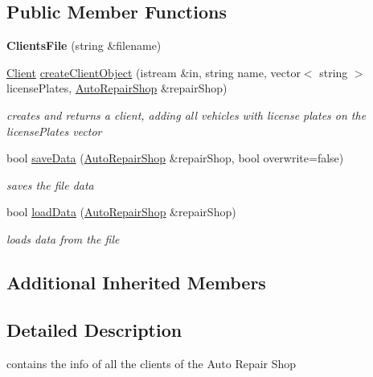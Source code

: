 \subsection*{Public Member Functions}
\begin{DoxyCompactItemize}
\item 
\hypertarget{class_clients_file_a193a5c33a221b9a7a240c8e21325f5bc}{}{\bfseries Clients\+File} (string \&filename)\label{class_clients_file_a193a5c33a221b9a7a240c8e21325f5bc}

\item 
\hypertarget{class_clients_file_a208a3388f95c5b181708d82f24f73807}{}\hyperlink{class_client}{Client} \hyperlink{class_clients_file_a208a3388f95c5b181708d82f24f73807}{create\+Client\+Object} (istream \&in, string name, vector$<$ string $>$ license\+Plates, \hyperlink{class_auto_repair_shop}{Auto\+Repair\+Shop} \&repair\+Shop)\label{class_clients_file_a208a3388f95c5b181708d82f24f73807}

\begin{DoxyCompactList}\small\item\em creates and returns a client, adding all vehicles with license plates on the license\+Plates vector \end{DoxyCompactList}\item 
\hypertarget{class_clients_file_a036db9670a49d65576c9b16f6c97b225}{}bool \hyperlink{class_clients_file_a036db9670a49d65576c9b16f6c97b225}{save\+Data} (\hyperlink{class_auto_repair_shop}{Auto\+Repair\+Shop} \&repair\+Shop, bool overwrite=false)\label{class_clients_file_a036db9670a49d65576c9b16f6c97b225}

\begin{DoxyCompactList}\small\item\em saves the file data \end{DoxyCompactList}\item 
bool \hyperlink{class_clients_file_a503c04b5e98494318abf2a26a0348de9}{load\+Data} (\hyperlink{class_auto_repair_shop}{Auto\+Repair\+Shop} \&repair\+Shop)
\begin{DoxyCompactList}\small\item\em loads data from the file \end{DoxyCompactList}\end{DoxyCompactItemize}
\subsection*{Additional Inherited Members}


\subsection{Detailed Description}
contains the info of all the clients of the Auto Repair Shop 

